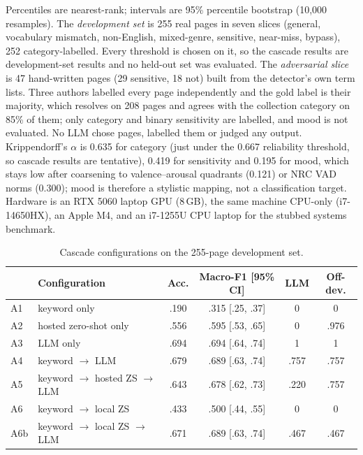 \documentclass[conference]{IEEEtran}
\begin{document}
Percentiles are nearest-rank; intervals are 95\% percentile bootstrap (10,000
resamples). The \emph{development set} is 255 real pages in seven slices (general,
vocabulary mismatch, non-English, mixed-genre, sensitive, near-miss, bypass), 252
category-labelled. Every threshold is chosen on it, so the cascade results are
development-set results and no held-out set was evaluated. The \emph{adversarial
slice} is 47 hand-written pages (29 sensitive, 18 not) built from the detector's
own term lists. Three authors labelled every page independently and the gold
label is their majority, which resolves on 208 pages and agrees with the
collection category on 85\% of them; only category and binary sensitivity are labelled, and
mood is not evaluated. No LLM chose pages, labelled them or judged any output.
Krippendorff's $\alpha$ \cite{kalpha} is 0.635 for category (just under the 0.667
reliability threshold, so cascade results are tentative), 0.419 for sensitivity
and 0.195 for mood, which stays low after coarsening to valence--arousal quadrants
\cite{kang} (0.121) or NRC VAD norms \cite{nrcvad} (0.300); mood is therefore a
stylistic mapping, not a classification target. Hardware is an RTX 5060 laptop GPU
(8\,GB), the same machine CPU-only (i7-14650HX), an Apple M4, and an i7-1255U CPU
laptop for the stubbed systems benchmark.

\begin{table}[t]
\caption{Cascade configurations on the 255-page development set.}
\label{tab:cascade}
\begin{center}
\scriptsize
\setlength{\tabcolsep}{2.5pt}
\begin{tabular}{llcccc}
\toprule
 & \textbf{Configuration} & \textbf{Acc.} & \textbf{Macro-F1 [95\% CI]} & \textbf{LLM} & \textbf{Off-dev.} \\
\midrule
A1  & keyword only                          & .190 & .315 [.25, .37] & 0    & 0 \\
A2  & hosted zero-shot only                 & .556 & .595 [.53, .65] & 0    & .976 \\
A3  & LLM only                              & .694 & .694 [.64, .74] & 1    & 1 \\
A4  & keyword $\to$ LLM                     & .679 & .689 [.63, .74] & .757 & .757 \\
A5  & keyword $\to$ hosted ZS $\to$ LLM     & .643 & .678 [.62, .73] & .220 & .757 \\
A6  & keyword $\to$ local ZS                & .433 & .500 [.44, .55] & 0    & 0 \\
A6b & keyword $\to$ local ZS $\to$ LLM      & .671 & .689 [.63, .74] & .467 & .467 \\
\bottomrule
\end{tabular}
\end{center}
\end{table}
\end{document}

